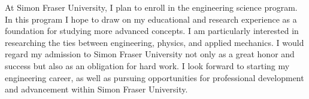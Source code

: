 \documentclass[11pt,a4paper,sans]{moderncv} %
\begin{document}
 At Simon Fraser University, I plan to enroll in the engineering science program. In this program I hope to draw on my educational and research experience as a foundation for studying more advanced concepts. I am particularly interested in researching the ties between engineering, physics, and applied mechanics. I would regard my admission to Simon Fraser University not only as a great honor and success but also as an obligation for hard work. I look forward to starting my engineering career, as well as pursuing opportunities for professional development and advancement within Simon Fraser University.


\end{document}
